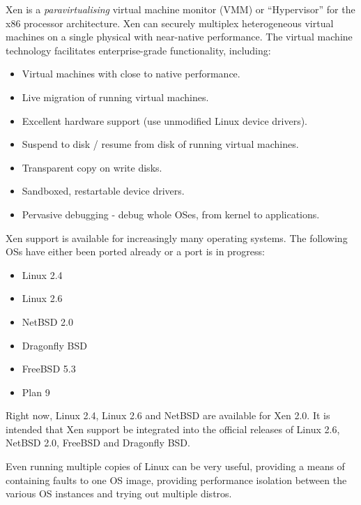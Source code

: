 \documentclass[11pt,twoside,final,openright]{xenstyle}
\begin{document}
Xen is a { \em paravirtualising } virtual machine monitor (VMM) or
``Hypervisor'' for the x86 processor architecture.  Xen can securely
multiplex heterogeneous virtual machines on a single physical with
near-native performance.  The virtual machine technology facilitates
enterprise-grade functionality, including:

\begin{itemize}
\item Virtual machines with close to native performance.
\item Live migration of running virtual machines.
\item Excellent hardware support (use unmodified Linux device drivers).
\item Suspend to disk / resume from disk of running virtual machines.
\item Transparent copy on write disks.
\item Sandboxed, restartable device drivers.
\item Pervasive debugging - debug whole OSes, from kernel to applications.
\end{itemize}

Xen support is available for increasingly many operating systems.  The
following OSs have either been ported already or a port is in
progress:
\begin{itemize}
\item Linux 2.4
\item Linux 2.6
\item NetBSD 2.0
\item Dragonfly BSD
\item FreeBSD 5.3
\item Plan 9
\end{itemize}

Right now, Linux 2.4, Linux 2.6 and NetBSD are available for Xen 2.0.
It is intended that Xen support be integrated into the official
releases of Linux 2.6, NetBSD 2.0, FreeBSD and Dragonfly BSD.

Even running multiple copies of Linux can be very useful, providing a
means of containing faults to one OS image, providing performance
isolation between the various OS instances and trying out multiple
distros.

\end{document}
